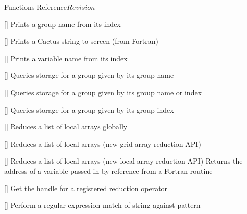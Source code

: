 \begin{cactuspart}{ Functions Reference}{}{$Revision$}
\begin{Lentry}
\item[\code{CCTK\_PrintGroup}] [\pageref{CCTK-PrintGroup}]
  Prints a group name from its index

\item[\code{CCTK\_PrintString}] [\pageref{CCTK-PrintString}]
  Prints a Cactus string to screen (from Fortran)

\item[\code{CCTK\_PrintVar}] [\pageref{CCTK-PrintVar}]
  Prints a variable name from its index

\item[\code{CCTK\_QueryGroupStorage}] [\pageref{CCTK-QueryGroupStorage}]
  Queries storage for a group given by its group name

\item[\code{CCTK\_QueryGroupStorageB}] [\pageref{CCTK-QueryGroupStorageB}]
  Queries storage for a group given by its group name or index

\item[\code{CCTK\_QueryGroupStorageI}] [\pageref{CCTK-QueryGroupStorageI}]
  Queries storage for a group given by its group index

\item[\code{CCTK\_ReduceArraysGlobally}] [\pageref{CCTK-ReduceArraysGlobally}]
  Reduces a list of local arrays globally

\item[\code{CCTK\_ReduceGridArrays}] [\pageref{CCTK-ReduceGridArrays}]
  Reduces a list of local arrays (new grid array reduction API)

\item[\code{CCTK\_ReduceLocalArrays}] [\pageref{CCTK-ReduceLocalArrays}]
  Reduces a list of local arrays (new local array reduction API)
  Returns the address of a variable passed in by reference
  from a Fortran routine



\item[\code{CCTK\_ReductionHandle}] [\pageref{CCTK-ReductionHandle}]
  Get the handle for a registered reduction operator

\item[\code{CCTK\_RegexMatch}] [\pageref{CCTK-RegexMatch}]
  Perform a regular expression match of string against pattern


\end{Lentry}
\end{cactuspart}
